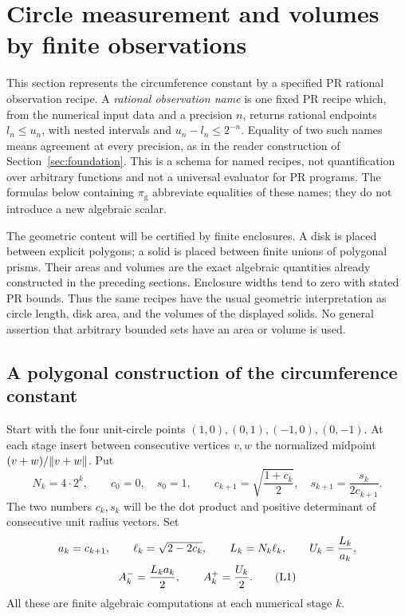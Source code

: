 \section{Circle measurement and volumes by finite observations}
\label{sec:limits}

This section represents the circumference constant by a specified PR
rational observation recipe. A \emph{rational observation name} is one fixed PR recipe
which, from the numerical input data and a precision $n$, returns rational
endpoints $l_n\le u_n$, with nested intervals and
$u_n-l_n\le2^{-n}$. Equality of two such names means agreement at every
precision, as in the reader construction of Section~\ref{sec:foundation}.
This is a schema for named recipes, not quantification over arbitrary
functions and not a universal evaluator for PR programs. The formulas
below containing $\pi_{\mathrm g}$ abbreviate equalities of these names;
they do not introduce a new algebraic scalar.

The geometric content will be certified by finite enclosures. A disk is
placed between explicit polygons; a solid is placed between finite unions
of polygonal prisms. Their areas and volumes are the exact algebraic
quantities already constructed in the preceding sections. Enclosure
widths tend to zero with stated PR bounds. Thus the same recipes have the
usual geometric interpretation as circle length, disk area, and the
volumes of the displayed solids. No general assertion that arbitrary
bounded sets have an area or volume is used.

\subsection{A polygonal construction of the circumference constant}

Start with the four unit-circle points $(1,0),(0,1),(-1,0),(0,-1)$.
At each stage insert between consecutive vertices $v,w$ the normalized
midpoint $(v+w)/\lVert v+w\rVert$. Put
\[
 N_k=4\cdot2^k,\qquad c_0=0,\quad s_0=1,\qquad
 c_{k+1}=\sqrt{\frac{1+c_k}{2}},\quad
 s_{k+1}=\frac{s_k}{2c_{k+1}}.
\]
The two numbers $c_k,s_k$ will be the dot product and positive determinant
of consecutive unit radius vectors. Set
\begin{gather}
 a_k=c_{k+1},\qquad \ell_k=\sqrt{2-2c_k},\qquad
 L_k=N_k\ell_k,\qquad U_k=\frac{L_k}{a_k},\notag\\
 A_k^-=\frac{L_ka_k}{2},\qquad A_k^+=\frac{U_k}{2}.    \tag{L1}
\end{gather}
All these are finite algebraic computations at each numerical stage $k$.

